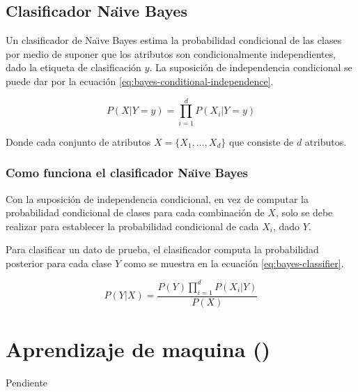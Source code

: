 \subsection{Clasificador Na\"{\i}ve Bayes} \label{subsec:naivebayes}
Un clasificador de Na\"{\i}ve Bayes estima la probabilidad condicional de las clases por medio de suponer que los atributos son condicionalmente independientes, dado la etiqueta de clasificación $y$. La suposición de independencia condicional se puede dar por la ecuación \ref{eq:bayes-conditional-independence}.

\begin{equation} \label{eq:bayes-conditional-independence}
  P(X|Y=y) = \prod_{i=1}^{d} P(X_i|Y=y)
\end{equation}

Donde cada conjunto de atributos $X=\{ X_1, \ldots, X_d \}$ que consiste de $d$ atributos.
\subsubsection{Como funciona el clasificador Na\"{\i}ve Bayes}
Con la suposición de independencia condicional, en vez de computar la probabilidad condicional de clases para cada combinación de $X$, solo se debe realizar para establecer la probabilidad condicional de cada $X_i$, dado $Y$.

Para clasificar un dato de prueba, el clasificador computa la probabilidad posterior para cada clase $Y$ como se muestra en la ecuación \ref{eq:bayes-classifier}.

\begin{equation} \label{eq:bayes-classifier}
  P(Y|X) = \frac{P(Y) \prod_{i=1}^{d}P(X_i|Y)}{P(X)}
\end{equation}


\section{Aprendizaje de maquina ()} \label{sec:ML}
Pendiente